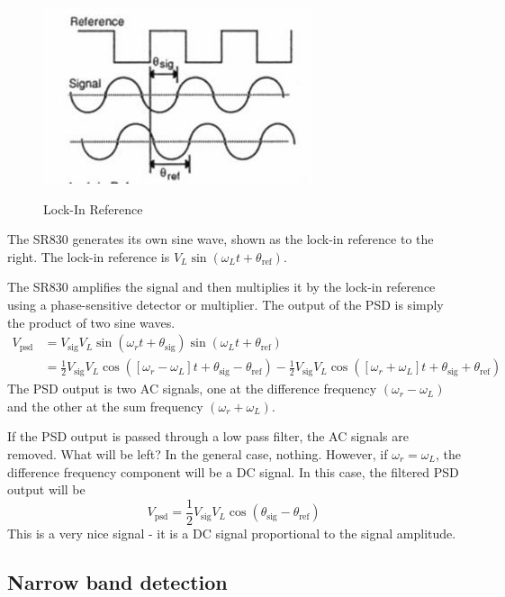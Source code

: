 \documentclass{../lab}
\begin{document}
\begin{figure}[h]
    \centering
    \href{http://experimentationlab.berkeley.edu/sites/default/files/images/300px-NMR33.jpg}{\includegraphics[width=0.5\linewidth]{images/300px-NMR33.jpg}}
    \caption{Lock-In Reference}
    \label{fig:300px-NMR33}
\end{figure}

The SR830 generates its own sine wave, shown as the lock-in reference to the right. The lock-in reference is $V_L \sin(\omega_Lt + \theta_\text{ref})$.

The SR830 amplifies the signal and then multiplies it by the lock-in reference using a phase-sensitive detector or multiplier. The output of the PSD is simply the product of two sine waves.
\begin{align*}
    V_\text{psd} &= V_\text{sig} V_L \sin (\omega_rt + \theta_\text{sig}) \sin (\omega_Lt + \theta_\text{ref}) \\
    &= \frac{1}{2} V_\text{sig} V_L \cos ([\omega_r - \omega_L ]t + \theta_\text{sig} - \theta_\text{ref}) - \frac{1}{2} V_\text{sig} V_L \cos ([\omega_r + \omega_L ]t + \theta_\text{sig} + \theta_\text{ref})
\end{align*}
The PSD output is two AC signals, one at the difference frequency $(\omega_r - \omega_L)$ and the other at the sum frequency $(\omega_r + \omega_L)$.

If the PSD output is passed through a low pass filter, the AC signals are removed. What will be left? In the general case, nothing. However, if $\omega_r = \omega_L$, the difference frequency component will be a DC signal. In this case, the filtered PSD output will be
\[
    V_\text{psd} = \frac{1}{2} V_\text{sig} V_L \cos(\theta_\text{sig} - \theta_\text{ref})
\]
This is a very nice signal - it is a DC signal proportional to the signal amplitude.

\subsection{Narrow band detection}
\end{document}
